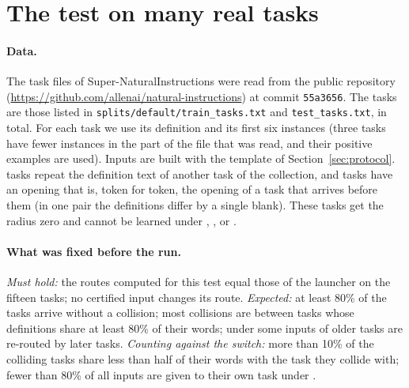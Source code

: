 \begin{table}[h]
  \caption{The mechanical edit test in full (fifteen tasks, 1{,}197 test inputs per row, 1{,}097 in
  the last three rows; T5-base word-vectors). ``Worst task'': the task with the lowest share.}
  \label{tab:editsfull}
  \centering
  \footnotesize
  
\end{table}

\begin{table}[h]
  \caption{The mechanical edit test by task, ordered by the length $n_k$ of the opening in tokens.
  $100\,R_k/D$: the share of the weight of the opening, in per cent, that an edit may remove and add
  without any possibility of leaving the zone (Proposition~\ref{prop:edits}). ``drop.'' and
  ``repl.'': dropped and replaced words.}
  \label{tab:editspertask}
  \centering
  \footnotesize
  \setlength{\tabcolsep}{4pt}
  
\end{table}

\FloatBarrier
\section{The test on many real tasks}
\label{app:many}

\paragraph{Data.} The task files of Super-NaturalInstructions were read from the public repository
(\url{https://github.com/allenai/natural-instructions}) at commit \texttt{55a3656}. The tasks are
those listed in \texttt{splits/default/train\_tasks.txt} and \texttt{test\_tasks.txt}, \ManyTasks{}
in total. For each task we use its definition and its first six instances (three tasks have fewer
instances in the part of the file that was read, and their positive examples are used). Inputs are
built with the template of Section~\ref{sec:protocol}. \ManySamePairs{} tasks repeat the definition text of another task of the collection, and
\ManyZeroRadius{} tasks have an opening that is, token for token, the opening of a task that arrives
before them (in one pair the definitions differ by a single blank). These \ManyZeroRadius{} tasks
get the radius zero and cannot be learned under \cert{}, \exactfirst{}, \nearest{} or \keyswitch{}.

\paragraph{What was fixed before the run.} \emph{Must hold:} the routes computed for this test equal
those of the launcher on the fifteen tasks; no certified input changes its route. \emph{Expected:}
at least 80\% of the tasks arrive without a collision; most collisions are between tasks whose
definitions share at least 80\% of their words; under \nearest{} some inputs of older tasks are
re-routed by later tasks. \emph{Counting against the switch:} more than 10\% of the colliding tasks
share less than half of their words with the task they collide with; fewer than 80\% of all inputs
are given to their own task under \cert{}.

